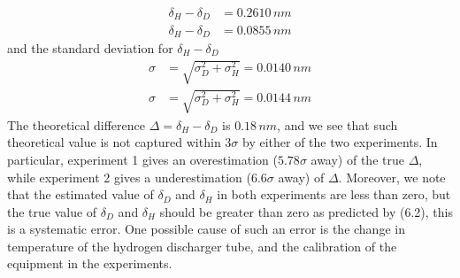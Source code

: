 \documentclass[11pt]{book}
\theoremstyle{break}
\theoremstyle{break}
\begin{document}
\begin{align*}
\delta_H - \delta_D &= 0.2610\, nm
\tag{experiment 1}\\
\delta_H - \delta_D &= 0.0855\, nm \tag{experiment 2}
\end{align*} 
and the standard deviation for $\delta_H - \delta_D$
\begin{align*}
\sigma &= \sqrt{\sigma_{D}^2 + \sigma_{H}^2} = 0.0140\,nm  \tag{experiment 1}\\
\sigma &= \sqrt{\sigma_{D}^2 + \sigma_{H}^2} = 0.0144\, nm  \tag{experiment 2}
\end{align*}
The theoretical difference $\Delta =\delta_H - \delta_D$ is $0.18\, nm$, and we see that such theoretical value is not captured within $3\sigma$ by either of the two experiments. In particular, experiment 1 gives an overestimation ($5.78\sigma$ away) of the true $\Delta$, while experiment 2 gives a underestimation ($6.6\sigma$ away) of $\Delta$. Moreover, we note that the estimated value of $\delta_D$ and $\delta_H$ in both experiments are less than zero, but the true value of $\delta_D$ and $\delta_H$ should be greater than zero as predicted by (6.2), this is a systematic error. One possible cause of such an error is the change in temperature of the hydrogen discharger tube, and the calibration of the equipment in the experiments. \\
\end{document}
